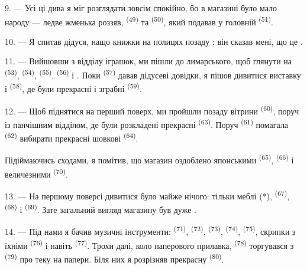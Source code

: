 
9. --- Усі ці дива я міг розглядати зовсім спокійно, бо в магазині було мало
народу --- ледве жменька роззяв,  \textsuperscript{(49)} та
 \textsuperscript{(50)}, який подавав  у
головній  \textsuperscript{(51)}.

10. --- Я спитав дідуся, нащо книжки на полицях позаду ; він
сказав мені, що це .

\VUsaut{3.6mm}
\VUsaut{2.8mm}

11. --- Вийшовши з відділу іграшок, ми пішли до лимарського, щоб глянути на
 \textsuperscript{(53)},  \textsuperscript{(54)},
 \textsuperscript{(55)},  \textsuperscript{(56)}
і . Поки  \textsuperscript{(57)} давав
дідусеві довідки, я пішов дивитися виставку  і 
\textsuperscript{(58)}, де були прекрасні  і зграбні
 \textsuperscript{(59)}.

12. --- Щоб піднятися на перший поверх, ми пройшли позаду вітрини
 \textsuperscript{(60)}, поруч із панчішним відділом, де були
розкладені прекрасні  \textsuperscript{(63)}. Поруч
 \textsuperscript{(61)} помагала 
\textsuperscript{(62)} вибирати прекрасні шовкові 
\textsuperscript{(64)}.

Підіймаючись сходами, я помітив, що магазин оздоблено японськими
 \textsuperscript{(65)}, 
\textsuperscript{(66)} і величезними  \textsuperscript{(70)}.

13. --- На першому поверсі дивитися було майже нічого: тільки меблі (*),
 \textsuperscript{(67)}, 
\textsuperscript{(68)} і  \textsuperscript{(69)}. Зате
загальний вигляд магазину був дуже .

14. --- Під нами я бачив музичні інструменти: 
\textsuperscript{(71)},  \textsuperscript{(72)},
 \textsuperscript{(73)}, 
\textsuperscript{(74)},  \textsuperscript{(75)}, скрипки з
їхніми  \textsuperscript{(76)} і навіть 
\textsuperscript{(77)}. Трохи далі, коло паперового прилавка, 
\textsuperscript{(78)} торгувався з  \textsuperscript{(79)} про
теку на папери. Біля них я розрізняв прекрасну 
\textsuperscript{(80)}.

